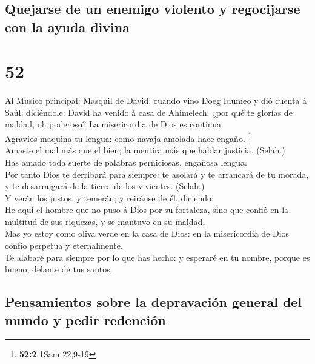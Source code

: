\hypertarget{quejarse-de-un-enemigo-violento-y-regocijarse-con-la-ayuda-divina}{%
\subsection{Quejarse de un enemigo violento y regocijarse con la ayuda
divina}\label{quejarse-de-un-enemigo-violento-y-regocijarse-con-la-ayuda-divina}}

\hypertarget{section-51}{%
\section{52}\label{section-51}}

 Al Músico principal: Masquil de David, cuando vino Doeg
Idumeo y dió cuenta á Saúl, diciéndole: David ha venido á casa de
Ahimelech. ¿por qué te glorías de maldad, oh poderoso? La misericordia
de Dios es continua.\\
 Agravios maquina tu lengua: como navaja amolada hace
engaño. \footnote{\textbf{52:2} 1Sam 22,9-19}\\
 Amaste el mal más que el bien; la mentira más que hablar
justicia. (Selah.)\\
 Has amado toda suerte de palabras perniciosas, engañosa
lengua.\\
 Por tanto Dios te derribará para siempre: te asolará y te
arrancará de tu morada, y te desarraigará de la tierra de los vivientes.
(Selah.)\\
 Y verán los justos, y temerán; y reiránse de él,
diciendo:\\
 He aquí el hombre que no puso á Dios por su fortaleza,
sino que confió en la multitud de sus riquezas, y se mantuvo en su
maldad.\\
 Mas yo estoy como oliva verde en la casa de Dios: en la
misericordia de Dios confío perpetua y eternalmente.\\
 Te alabaré para siempre por lo que has hecho: y esperaré
en tu nombre, porque es bueno, delante de tus santos.

\hypertarget{pensamientos-sobre-la-depravaciuxf3n-general-del-mundo-y-pedir-redenciuxf3n-1}{%
\subsection{Pensamientos sobre la depravación general del mundo y pedir
redención}\label{pensamientos-sobre-la-depravaciuxf3n-general-del-mundo-y-pedir-redenciuxf3n-1}}

